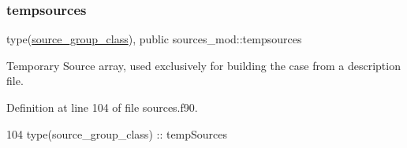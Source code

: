 \subsubsection{\texorpdfstring{tempsources}{tempsources}}
{\footnotesize\ttfamily type(\mbox{\hyperlink{structsources__mod_1_1source__group__class}{source\+\_\+group\+\_\+class}}), public sources\+\_\+mod\+::tempsources}



Temporary Source array, used exclusively for building the case from a description file. 



Definition at line 104 of file sources.\+f90.


\begin{DoxyCode}
104     \textcolor{keywordtype}{type}(source\_group\_class) :: tempSources
\end{DoxyCode}
